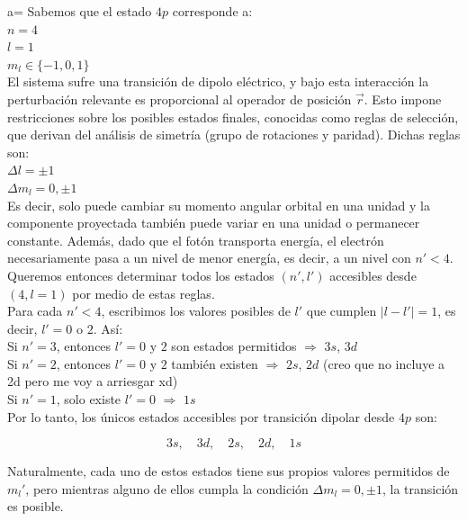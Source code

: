 \documentclass{article}
\theoremstyle{nonumberplain}
\begin{document}
a= Sabemos que el estado $4p$ corresponde a: \\
$n = 4$ \\
$l = 1$ \\
$m_l \in \{-1, 0, 1\}$ \\

El sistema sufre una transición de dipolo eléctrico, y bajo esta interacción la perturbación relevante es proporcional al operador de posición $\vec{r}$. Esto impone restricciones sobre los posibles estados finales, conocidas como reglas de selección, que derivan del análisis de simetría (grupo de rotaciones y paridad). Dichas reglas son: \\

 $\Delta l = \pm 1$ \\
 $\Delta m_l = 0, \pm 1$ \\

Es decir, solo puede cambiar su momento angular orbital en una unidad y la componente proyectada también puede variar en una unidad o permanecer constante. Además, dado que el fotón transporta energía, el electrón necesariamente pasa a un nivel de menor energía, es decir, a un nivel con $n' < 4$. \\

Queremos entonces determinar todos los estados $(n', l')$ accesibles desde $(4, l=1)$ por medio de estas reglas. \\

Para cada $n' < 4$, escribimos los valores posibles de $l'$ que cumplen $|l - l'| = 1$, es decir, $l' = 0$ o $2$. Así: \\

 Si $n' = 3$, entonces $l' = 0$ y $2$ son estados permitidos $\Rightarrow$ $3s$, $3d$ \\
 Si $n' = 2$, entonces $l' = 0$ y $2$ también existen $\Rightarrow$ $2s$, $2d$ (creo que no incluye a 2d pero me voy a arriesgar xd) \\
 Si $n' = 1$, solo existe $l'=0$ $\Rightarrow$ $1s$ \\

Por lo tanto, los únicos estados accesibles por transición dipolar desde $4p$ son:

$$
3s,\quad 3d,\quad 2s,\quad 2d,\quad 1s
$$

Naturalmente, cada uno de estos estados tiene sus propios valores permitidos de $m_l'$, pero mientras alguno de ellos cumpla la condición $\Delta m_l = 0, \pm 1$, la transición es posible. \\
\end{document}
